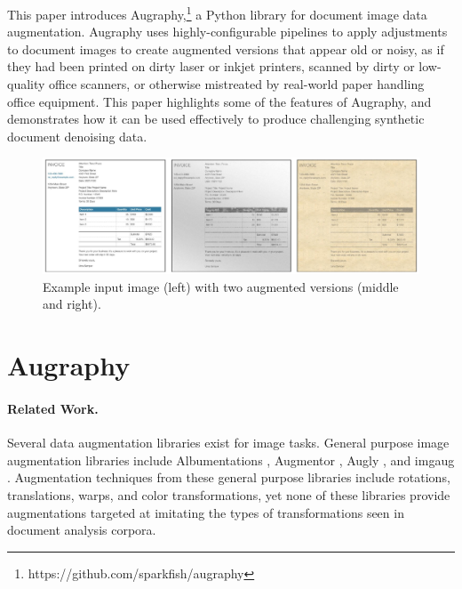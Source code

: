 \documentclass[runningheads]{llncs}
\begin{document}
This paper introduces Augraphy,\footnote{https://github.com/sparkfish/augraphy} a Python library for document image data augmentation.
Augraphy uses highly-configurable pipelines to apply adjustments to document images to create augmented versions that appear old or noisy, as if they had been printed on dirty laser or inkjet printers, scanned by dirty or low-quality office scanners, or otherwise mistreated by real-world paper handling office equipment.
This paper highlights some of the features of Augraphy, and demonstrates how it can be used effectively to produce challenging synthetic document denoising data.
\begin{figure}
    \centering
    \includegraphics[width=\linewidth]{augraphy_3panel.pdf}
    \caption{Example input image (left) with two augmented versions (middle and right).}
    \label{fig:3panel}
\end{figure}

\section{Augraphy}
\paragraph{\textbf{Related Work.~~}}
 Several data augmentation libraries exist for image tasks. General purpose image augmentation libraries include Albumentations
 \cite{albumentations}, Augmentor
 \cite{augmentor}, Augly
 \cite{augly}, and imgaug
 \cite{imgaug}.
Augmentation techniques from these general purpose libraries include rotations, translations, warps, and color transformations, yet none of these libraries provide augmentations targeted at imitating the types of transformations seen in document analysis corpora.
\end{document}
